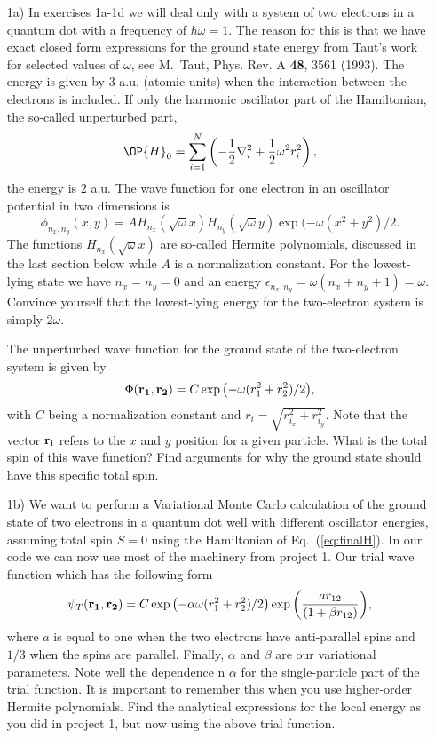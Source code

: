 \documentclass[10pt]{article}
\begin{document}
\begin{enumerate}

\item[1a)]  In exercises 1a-1d we will deal only with a system of 
two electrons in a quantum dot with a frequency of $\hbar\omega = 1$. 
The reason for this is that we have exact closed form expressions 
for the ground state energy from Taut's work for selected values of $\omega$, 
see M.~Taut, Phys. Rev. A {\bf 48}, 3561 (1993).
The energy is given by $3$ a.u.  (atomic units) when the interaction between the electrons is included.
If only the harmonic oscillator part of the Hamiltonian,
the so-called unperturbed part,
\[ \OP{H}_0=\sum_{i=1}^{N} \left(  -\frac{1}{2} \nabla_i^2 + \frac{1}{2} \omega^2r_i^2  \right),\]
the energy is $2$ a.u.
The wave function for one electron in an oscillator potential in two dimensions is
\[
\phi_{n_x,n_y}(x,y) = A H_{n_x}(\sqrt{\omega}x)H_{n_y}(\sqrt{\omega}y)\exp{(-\omega(x^2+y^2)/2}.
\]
The functions $H_{n_x}(\sqrt{\omega}x)$ are so-called Hermite polynomials, discussed in the last section below  while $A$ is a normalization constant. 
For the lowest-lying state we have $n_x=n_y=0$ and an energy $\epsilon_{n_x,n_y}=\omega(n_x+n_y+1) = \omega$.
Convince yourself that the lowest-lying energy for the two-electron system  is simply $2\omega$.

The unperturbed wave function for the ground state of the two-electron system is given by 
\[
\Phi({\bf r_1},{\bf r_2}) = C\exp{\left(-\omega(r_1^2+r_2^2)/2\right)},
\]
with $C$ being a normalization constant and $r_i = \sqrt{r_{i_x}^2+r_{i_y}^2}$. Note that the vector ${\bf r_i}$ 
refers to the $x$ and $y$ position for a given particle.
What is the total spin of this wave function? Find arguments for why the ground state should have
this specific total spin. 

\item[1b)] We want to perform  a Variational Monte Carlo calculation of the ground state of two electrons in a quantum dot well with different oscillator energies, assuming total spin $S=0$ using the Hamiltonian of 
Eq.~(\ref{eq:finalH}). 
In our code we can now use most of the machinery from project 1. 
Our trial wave function which has the following form
\begin{equation}
   \psi_{T}({\bf r_1},{\bf r_2}) = 
   C\exp{\left(-\alpha\omega(r_1^2+r_2^2)/2\right)}
   \exp{\left(\frac{ar_{12}}{(1+\beta r_{12})}\right)}, 
\label{eq:trial}
\end{equation}
where $a$ is equal to one when the two electrons have anti-parallel spins and $1/3$ when the spins are parallel. Finally, $\alpha$ and $\beta$ are our variational parameters. Note well the dependence n $\alpha$ for the single-particle part of the trial function. It is important to remember this when you use higher-order Hermite polynomials.
Find the analytical expressions for the local energy as you did in project 1, but now using the above trial function.


\end{enumerate}
\end{document}
